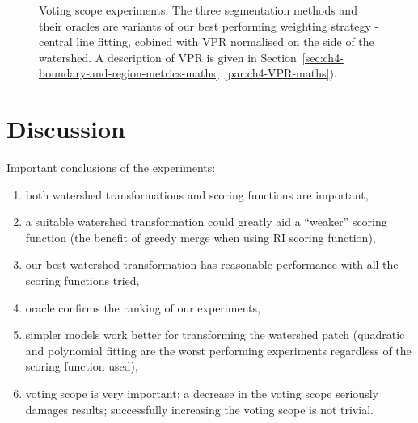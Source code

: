 \begin{figure}[ht!]
\centering
\caption[Voting scope experiments.]{Voting scope experiments. The three segmentation methods and their oracles are variants of our best performing weighting strategy - central line fitting, cobined with VPR normalised on the side of the watershed. A description of VPR is given in Section~\ref*{sec:ch4-boundary-and-region-metrics-maths}~\ref{par:ch4-VPR-maths}).}
\label{fig:voting-scope-line-centre-VPR-ws}
\end{figure}

\section{Discussion}

Important conclusions of the experiments:
\begin{enumerate}
 \item both watershed transformations and scoring functions are important,
 \item a suitable %
 watershed transformation could greatly aid a ``weaker'' scoring function (\eg the benefit of greedy merge when using RI scoring function),
 \item our best watershed transformation has reasonable performance with all the scoring functions tried,
 \item oracle confirms the ranking of our experiments,
 \item simpler models work better for transforming the watershed patch (\eg quadratic and polynomial fitting are the worst performing experiments regardless of the scoring function used),
 \item voting scope is very important; a decrease in the voting scope seriously damages results; successfully increasing the voting scope is not trivial.
\end{enumerate}